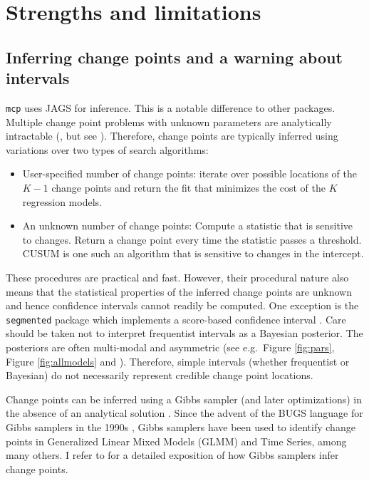 \documentclass[
  american,
]{article}
\begin{document}
\hypertarget{compare_packages}{%
\section{Strengths and limitations}\label{compare_packages}}

\hypertarget{inferring-change-points-and-a-warning-about-intervals}{%
\subsection{Inferring change points and a warning about intervals}\label{inferring-change-points-and-a-warning-about-intervals}}

\texttt{mcp} uses JAGS \citep{plummer2003} for inference. This is a notable difference to other packages. Multiple change point problems with unknown parameters are analytically intractable (\citep{stephens1994, carlin1992}, but see \citep{jensen2013}). Therefore, change points are typically inferred using variations over two types of search algorithms:

\begin{itemize}
\item
  User-specified number of change points: iterate over possible locations of the \(K-1\) change points and return the fit that minimizes the cost of the \(K\) regression models.
\item
  An unknown number of change points: Compute a statistic that is sensitive to changes. Return a change point every time the statistic passes a threshold. CUSUM \citep{page1954, lee2003} is one such an algorithm that is sensitive to changes in the intercept.
\end{itemize}

These procedures are practical and fast. However, their procedural nature also means that the statistical properties of the inferred change points are unknown and hence confidence intervals cannot readily be computed. One exception is the \texttt{segmented} package which implements a score-based confidence interval \citep{muggeo2017}. Care should be taken not to interpret frequentist intervals as a Bayesian posterior. The posteriors are often multi-modal and asymmetric (see e.g.~Figure \ref{fig:pars}, Figure \ref{fig:allmodels} and \citep{raftery1986}). Therefore, simple intervals (whether frequentist or Bayesian) do not necessarily represent credible change point locations.

Change points can be inferred using a Gibbs sampler (and later optimizations) in the absence of an analytical solution \citep{stephens1994, carlin1992}. Since the advent of the BUGS language for Gibbs samplers in the 1990s \citep{lunn2012}, Gibbs samplers have been used to identify change points in Generalized Linear Mixed Models (GLMM) and Time Series, among many others. I refer to\citep{stephens1994, carlin1992} for a detailed exposition of how Gibbs samplers infer change points.
\end{document}
